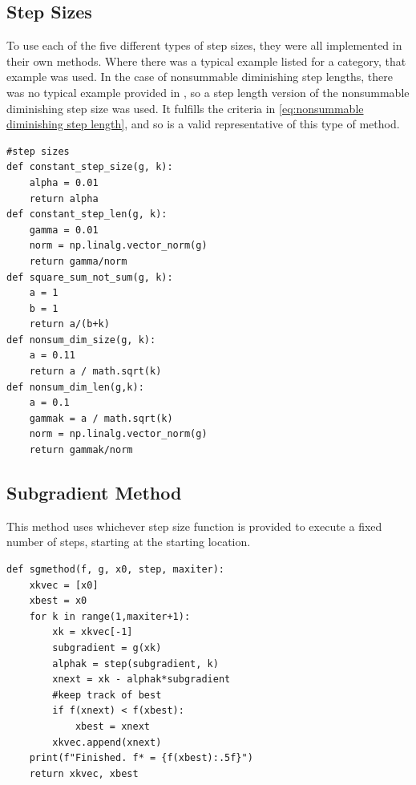\documentclass[journal,onecolumn]{IEEEtran}
\begin{document}
\subsection{Step Sizes}\label{sec:linear example step sizes}
To use each of the five different types of step sizes, they were all implemented in their own methods. Where there was a typical example listed for a category, that example was used. In the case of nonsummable diminishing step lengths, there was no typical example provided in \cite{boydparksubgradients}, so a step length version of the nonsummable diminishing step size was used. It fulfills the criteria in \eqref{eq:nonsummable diminishing step length}, and so is a valid representative of this type of method.
\begin{verbatim}
#step sizes
def constant_step_size(g, k):
    alpha = 0.01
    return alpha
def constant_step_len(g, k):
    gamma = 0.01
    norm = np.linalg.vector_norm(g)
    return gamma/norm
def square_sum_not_sum(g, k):
    a = 1
    b = 1
    return a/(b+k)
def nonsum_dim_size(g, k):
    a = 0.11
    return a / math.sqrt(k)
def nonsum_dim_len(g,k):
    a = 0.1
    gammak = a / math.sqrt(k)
    norm = np.linalg.vector_norm(g)
    return gammak/norm
\end{verbatim}

\subsection{Subgradient Method}
This method uses whichever step size function is provided to execute a fixed number of steps, starting at the starting location.
\begin{verbatim}
def sgmethod(f, g, x0, step, maxiter):
    xkvec = [x0]
    xbest = x0
    for k in range(1,maxiter+1):
        xk = xkvec[-1]
        subgradient = g(xk)
        alphak = step(subgradient, k)
        xnext = xk - alphak*subgradient
        #keep track of best
        if f(xnext) < f(xbest):
            xbest = xnext
        xkvec.append(xnext)
    print(f"Finished. f* = {f(xbest):.5f}")
    return xkvec, xbest
\end{verbatim}
\end{document}
